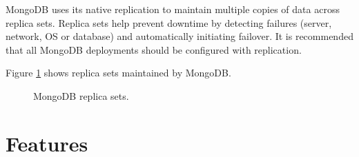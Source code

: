 \documentclass[9pt,twocolumn,twoside]{../../styles/osajnl}
\begin{document}
MongoDB uses its native replication to maintain multiple copies of data across replica sets. Replica sets help prevent downtime by detecting failures (server, network, OS or database) and automatically initiating failover. It is recommended that all MongoDB deployments should be configured with replication.

Figure \ref{fig:figure2} shows replica sets maintained by MongoDB.

\begin{figure}[htbp]
\centering
{}
\caption{MongoDB replica sets.}
\label{fig:figure2}
\end{figure}

\section{Features}
\end{document}
